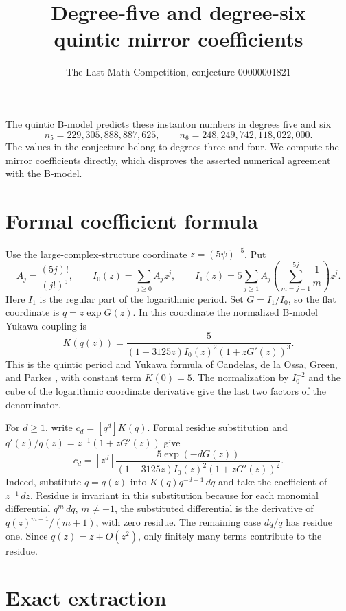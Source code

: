\documentclass[11pt]{article}
\title{Degree-five and degree-six\\quintic mirror coefficients}
\author{The Last Math Competition, conjecture 00000001821}
\date{}
\begin{document}
\maketitle

The quintic B-model predicts these instanton numbers in degrees five and six
\[
n_5=229{,}305{,}888{,}887{,}625,\qquad n_6=248{,}249{,}742{,}118{,}022{,}000.
\]
The values in the conjecture belong to degrees three and four. We compute
the mirror coefficients directly, which disproves the asserted numerical
agreement with the B-model.

\section*{Formal coefficient formula}

Use the large-complex-structure coordinate \(z=(5\psi)^{-5}\). Put
\[
 A_j=\frac{(5j)!}{(j!)^5},\qquad
 I_0(z)=\sum_{j\ge 0} A_jz^j,\qquad
 I_1(z)=5\sum_{j\ge 1} A_j\left(\sum_{m=j+1}^{5j}\frac1m\right)z^j.
\]
Here \(I_1\) is the regular part of the logarithmic period. Set
\(G=I_1/I_0\), so the flat coordinate is \(q=z\exp G(z)\).
In this coordinate the normalized B-model Yukawa coupling is
\begin{equation}
 K(q(z))=\frac{5}{(1-3125z)I_0(z)^2(1+zG'(z))^3}.
 \label{eq:yukawa}
\end{equation}
This is the quintic period and Yukawa formula of Candelas, de la Ossa,
Green, and Parkes \cite[sections~4.2 and~5.3]{cogp}, with constant term
\(K(0)=5\). The normalization by \(I_0^{-2}\) and the cube of the
logarithmic coordinate derivative give the last two factors of the denominator.

For \(d\ge 1\), write \(c_d=[q^d]K(q)\). Formal residue substitution and
\(q'(z)/q(z)=z^{-1}(1+zG'(z))\) give
\begin{equation}
 c_d=[z^d] \frac{5\exp(-dG(z))}
                         {(1-3125z)I_0(z)^2(1+zG'(z))^2}.
 \label{eq:residue}
\end{equation}
Indeed, substitute \(q=q(z)\) into \(K(q)q^{-d-1}\,dq\) and take the
coefficient of \(z^{-1}\,dz\). Residue is invariant in this substitution
because for each monomial differential \(q^m\,dq\), \(m\ne-1\), the
substituted differential is the derivative of \(q(z)^{m+1}/(m+1)\), with
zero residue. The remaining case \(dq/q\) has residue one. Since
\(q(z)=z+O(z^2)\), only finitely many terms contribute to the residue.

\section*{Exact extraction}
\end{document}
